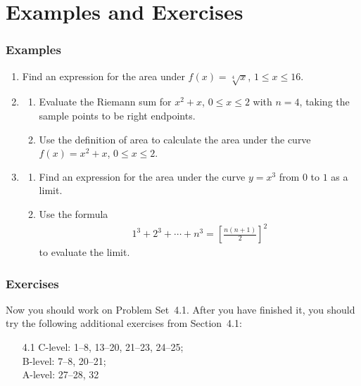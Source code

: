 \documentclass[serif,ignorenonframetext]{beamer}
\begin{document}
\section{Examples and Exercises}

\begin{frame}
  \frametitle{Examples}
  \begin{enumerate}
  \item Find an expression for the area under 
    $f(x)=\sqrt[4]{x}$, $1\le x\le 16$.
  \item 
    \begin{enumerate}
    \item Evaluate the Riemann sum for $x^2+x$, $0\le x\le 2$
      with $n=4$, taking the sample points to be
      right endpoints.
    \item Use the definition of area to calculate
      the area under the curve $f(x)=x^2+x$, $0\le x\le 2$.
    \end{enumerate}
  \item
    \begin{enumerate}
    \item Find an expression for the area under the curve $y=x^3$
      from $0$ to $1$ as a limit.
    \item Use the formula
      \begin{align*}
        1^3+2^3+\cdots+n^3=\left[ \frac{n(n+1)}{2}\right]^2
      \end{align*}
      to evaluate the limit.
    \end{enumerate}
  \end{enumerate} 
\end{frame}

\begin{frame}
  \frametitle{Exercises}
  Now you should work on Problem Set~4.1.  After you have finished it,
  you should try the following additional exercises from Section~4.1:
  \begin{itemize}
  \item[4.1]
    C-level: 1--8, 13--20, 21--23, 24--25; \\
    B-level: 7--8, 20--21; \\
    A-level: 27--28, 32
  \end{itemize}
\end{frame}
\end{document}
